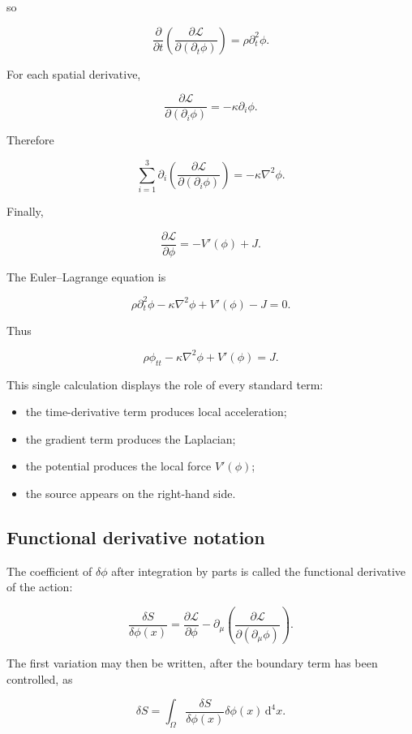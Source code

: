 so

\[
\frac{\partial}{\partial t}
\left(
\frac{\partial\mathcal{L}}
{\partial(\partial_{t}\phi)}
\right)
=
\rho\partial_{t}^{2}\phi.
\]

For each spatial derivative,

\[
\frac{\partial\mathcal{L}}
{\partial(\partial_{i}\phi)}
=
-\kappa\partial_{i}\phi.
\]

Therefore

\[
\sum_{i=1}^{3}
\partial_{i}
\left(
\frac{\partial\mathcal{L}}
{\partial(\partial_{i}\phi)}
\right)
=
-\kappa\nabla^{2}\phi.
\]

Finally,

\[
\frac{\partial\mathcal{L}}{\partial\phi}
=
-V'(\phi)+J.
\]

The Euler--Lagrange equation is

\[
\rho\partial_{t}^{2}\phi
-
\kappa\nabla^{2}\phi
+
V'(\phi)
-
J
=0.
\]

Thus

\[
\boxed{
\rho\phi_{tt}
-
\kappa\nabla^{2}\phi
+
V'(\phi)
=
J
}.
\]

This single calculation displays the role of every standard term:

\begin{itemize}
    \item the time-derivative term produces local acceleration;
    \item the gradient term produces the Laplacian;
    \item the potential produces the local force \(V'(\phi)\);
    \item the source appears on the right-hand side.
\end{itemize}

\subsection{Functional derivative notation}

The coefficient of \(\delta\phi\) after integration by parts is called the functional derivative of the action:

\[
\boxed{
\frac{\delta S}{\delta\phi(x)}
=
\frac{\partial\mathcal{L}}{\partial\phi}
-
\partial_{\mu}
\left(
\frac{\partial\mathcal{L}}
{\partial(\partial_{\mu}\phi)}
\right)
}.
\]

The first variation may then be written, after the boundary term has been controlled, as

\[
\delta S
=
\int_{\Omega}
\frac{\delta S}{\delta\phi(x)}
\delta\phi(x)
\,\mathrm{d}^{4}x.
\]

